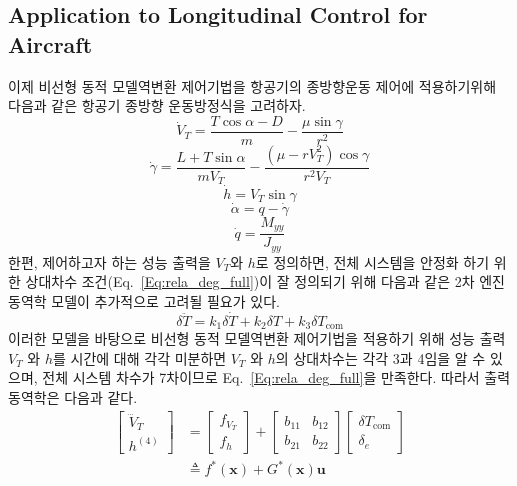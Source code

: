 \documentclass[a4paper, 12pt]{report}
\begin{document}
\subsection{Application to Longitudinal Control for Aircraft}
이제 비선형 동적 모델역변환 제어기법을 항공기의 종방향운동 제어에 적용하기위해 다음과 같은 항공기 종방향 운동방정식을 고려하자.
\begin{equation}
    \dot{V}_{T} = \frac{T\cos{\alpha}-D}{m} - \frac{\mu\sin{\gamma}}{r^{2}}
\end{equation}
\begin{equation}
    \dot{\gamma} = \frac{L+T\sin{\alpha}}{mV_{T}} - \frac{(\mu-rV_{T}^{2})\cos{\gamma}}{r^{2}V_{T}}
\end{equation}
\begin{equation}
    \dot{h} = V_{T}\sin{\gamma}
\end{equation}
\begin{equation}
    \dot{\alpha} = q-\dot{\gamma}
\end{equation}
\begin{equation}
    \dot{q} = \frac{M_{yy}}{J_{yy}}
\end{equation}
한편, 제어하고자 하는 성능 출력을 $V_{T}$와 $h$로 정의하면, 전체 시스템을 안정화 하기 위한 상대차수 조건(Eq.~\eqref{Eq:rela_deg_full})이 잘 정의되기 위해 다음과 같은 2차 엔진 동역학 모델이 추가적으로 고려될 필요가 있다.
\begin{equation}
    \delta\ddot{T} = k_{1}\delta\dot{T} + k_{2}\delta T + k_{3}\delta T_{\text{com}}
\end{equation}
이러한 모델을 바탕으로 비선형 동적 모델역변환 제어기법을 적용하기 위해 성능 출력 $V_{T}$ 와 $h$를 시간에 대해 각각 미분하면 $V_{T}$ 와 $h$의 상대차수는 각각 3과 4임을 알 수 있으며, 전체 시스템 차수가 7차이므로 Eq.~\eqref{Eq:rela_deg_full}을 만족한다. 따라서 출력 동역학은 다음과 같다.
\begin{equation}
  \begin{split}
    \begin{bmatrix}
      \dddot{V}_{T} \\
      h^{(4)}
    \end{bmatrix}
    &=
    \begin{bmatrix}
      f_{V_{T}} \\
      f_{h}
    \end{bmatrix}
    +
    \begin{bmatrix}
      b_{11} & b_{12} \\
      b_{21} & b_{22}
    \end{bmatrix}
    \begin{bmatrix}
       \delta T_{\text{com}}\\
       \delta_{e}
    \end{bmatrix}
    \\
    &\triangleq f^{*}(\mathbf{x}) + G^{*}(\mathbf{x})\mathbf{u}
  \end{split}
\end{equation}
\end{document}
